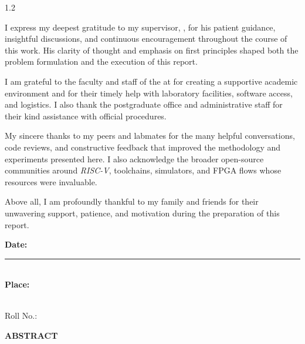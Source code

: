 \begin{center}
\begin{minipage}{0.92\textwidth}
\begin{spacing}{1.2}
{\large
I express my deepest gratitude to my supervisor, \textbf{\Supervisor}, for
his patient guidance, insightful discussions, and continuous encouragement
throughout the course of this work. His clarity of thought and emphasis on
first principles shaped both the problem formulation and the execution of this
report.

I am grateful to the faculty and staff of the \textbf{\Department} at
\textbf{\InstituteName} for creating a supportive academic environment and for
their timely help with laboratory facilities, software access, and logistics.
I also thank the postgraduate office and administrative staff for their kind
assistance with official procedures.

My sincere thanks to my peers and labmates for the many helpful conversations,
code reviews, and constructive feedback that improved the methodology and
experiments presented here. I also acknowledge the broader open-source
communities around \textit{RISC\mbox{-}V}, toolchains, simulators, and FPGA
flows whose resources were invaluable.

Above all, I am profoundly thankful to my family and friends for their
unwavering support, patience, and motivation during the preparation of this
report.
}
\end{spacing}
\end{minipage}
\end{center}

\vspace{1.6cm}
\noindent
\begin{minipage}[t]{0.48\textwidth}
  \textbf{Date:} \rule{5cm}{0.4pt}\\[0.6cm]
  \textbf{Place:} \InstituteCity
\end{minipage}\hfill
\begin{minipage}[t]{0.48\textwidth}
  \raggedleft
  \textbf{\AuthorName}\\
  Roll No.: \textbf{\RollNo}
\end{minipage}

\cleardoublepage
{}
\thispagestyle{empty}

\begin{center}
  {\Large \textbf{ABSTRACT}}
\end{center}
\vspace{0.6cm}

